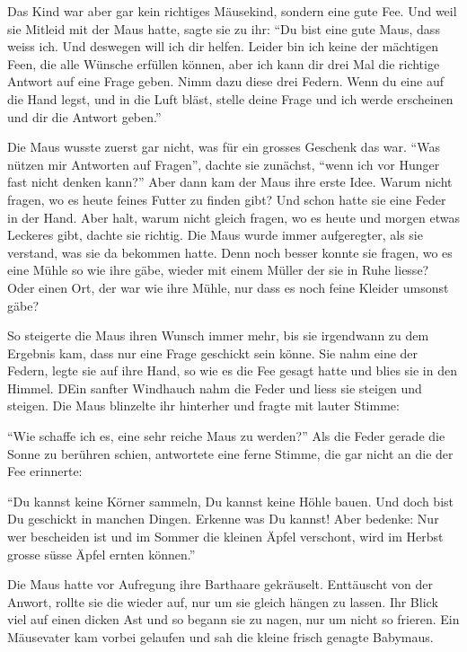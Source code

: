 Das Kind war aber gar kein richtiges Mäusekind, sondern eine gute Fee. Und weil sie Mitleid mit der Maus hatte, sagte sie zu ihr: \enquote{Du bist eine gute Maus, dass weiss ich. Und deswegen will ich dir helfen. Leider bin ich keine der mächtigen Feen, die alle Wünsche erfüllen können, aber ich kann dir drei Mal die richtige Antwort auf eine Frage geben. Nimm dazu diese drei Federn. Wenn du eine auf die Hand legst, und in die Luft bläst, stelle deine Frage und ich werde erscheinen und dir die Antwort geben.}

Die Maus wusste zuerst gar nicht, was für ein grosses Geschenk das war. \enquote{Was nützen mir  Antworten auf Fragen}, dachte sie zunächst, \enquote{wenn ich vor Hunger fast nicht denken kann?} Aber dann kam der Maus ihre erste Idee. Warum nicht fragen, wo es heute feines Futter zu finden gibt? Und schon hatte sie eine Feder in der Hand. Aber halt, warum nicht gleich fragen, wo es heute und morgen etwas Leckeres gibt, dachte sie richtig. Die Maus wurde immer aufgeregter, als sie verstand, was sie da bekommen hatte. Denn noch besser konnte sie fragen, wo es eine Mühle so wie ihre gäbe, wieder mit einem Müller der sie in Ruhe liesse? Oder einen Ort, der war wie ihre Mühle, nur dass es noch feine Kleider umsonst gäbe?

So steigerte die Maus ihren Wunsch immer mehr, bis sie irgendwann zu dem Ergebnis kam, dass nur eine Frage geschickt sein könne. Sie nahm eine der Federn, legte sie auf ihre Hand, so wie es die Fee gesagt hatte und blies sie in den Himmel. DEin sanfter Windhauch nahm die Feder und liess sie steigen und steigen. Die Maus blinzelte ihr hinterher und fragte mit lauter Stimme: 

\enquote{Wie schaffe ich es, eine sehr reiche Maus zu werden?} Als die Feder gerade die Sonne zu berühren schien, antwortete eine ferne Stimme, die gar nicht an die der Fee erinnerte:

\enquote{Du kannst keine Körner sammeln, Du kannst keine Höhle bauen. Und doch bist Du geschickt in manchen Dingen. Erkenne was Du kannst! Aber bedenke: Nur wer bescheiden ist und im Sommer die kleinen Äpfel verschont, wird im Herbst grosse süsse Äpfel ernten können.} 

Die Maus hatte vor Aufregung ihre Barthaare gekräuselt. Enttäuscht von der Anwort, rollte sie die wieder auf, nur um sie gleich hängen zu lassen. Ihr Blick viel auf einen dicken Ast und so begann sie zu nagen, nur um nicht so frieren. Ein Mäusevater kam vorbei gelaufen und sah die kleine frisch genagte Babymaus. 

